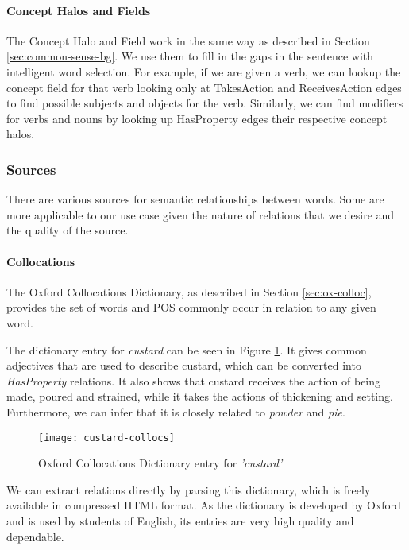 \paragraph{Concept Halos and Fields}

The Concept Halo and Field work in the same way as described in Section  \ref{sec:common-sense-bg}. We use them to fill in the gaps in the sentence with intelligent word selection. For example, if we are given a verb, we can lookup the concept field for that verb looking only at TakesAction and ReceivesAction edges to find possible subjects and objects for the verb. Similarly, we can find modifiers for verbs and nouns by looking up HasProperty edges their respective concept halos.

\subsubsection{Sources}
There are various sources for semantic relationships between words. Some are more applicable to our use case given the nature of relations that we desire and the quality of the source.

\paragraph{Collocations}
The Oxford Collocations Dictionary, as described in Section \ref{sec:ox-colloc}, provides the set of words and POS commonly occur in relation to any given word.

The dictionary entry for \textit{custard} can be seen in Figure \ref{fig:custard-collocs-2}. It gives common adjectives that are used to describe custard, which can be converted into \textit{HasProperty} relations. It also shows that custard receives the action of being made, poured and strained, while it takes the actions of thickening and setting. Furthermore, we can infer that it is closely related to \textit{powder} and \textit{pie}.

\begin{figure}[h!]
\centering
\texttt{[image: custard-collocs]}
\caption{Oxford Collocations Dictionary entry for \textit{'custard'}}
\label{fig:custard-collocs-2}
\end{figure}

We can extract relations directly by parsing this dictionary, which is freely available in compressed HTML format. As the dictionary is developed by Oxford and is used by students of English, its entries are very high quality and dependable.

